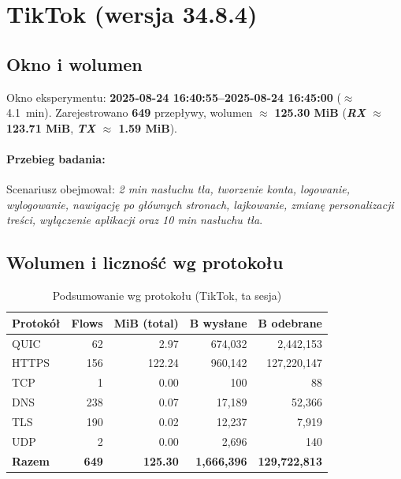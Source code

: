 \section{TikTok (wersja 34.8.4)}
\label{sec:tiktok}

\subsection*{Okno i wolumen}
Okno eksperymentu: \textbf{2025-08-24 16{:}40{:}55–2025-08-24 16{:}45{:}00} ($\approx$ \SI{4.1}{\minute}). 
Zarejestrowano \textbf{649} przepływy, wolumen $\approx$ \textbf{125.30 MiB} 
(\textbf{\emph{RX} $\approx$ 123.71 MiB}, \textbf{\emph{TX} $\approx$ 1.59 MiB}).

\paragraph{Przebieg badania:} 
Scenariusz obejmował: \emph{2 min nasłuchu tła, tworzenie konta, logowanie, wylogowanie, nawigację po głównych stronach, lajkowanie, zmianę personalizacji treści, wyłączenie aplikacji oraz 10 min nasłuchu tła}.

\subsection{Wolumen i liczność wg protokołu}
\begin{table}[H]
  \centering
  \caption{Podsumowanie wg protokołu (TikTok, ta sesja)}
  \label{tab:tiktok-proto}
  \begin{tabular}{lrrrr}
    \toprule
    \textbf{Protokół} & \textbf{Flows} & \textbf{MiB (total)} & \textbf{B wysłane} & \textbf{B odebrane} \\
    \midrule
    QUIC  & 62  & 2.97  & 674{,}032  & 2{,}442{,}153 \\
    HTTPS & 156 & 122.24 & 960{,}142 & 127{,}220{,}147 \\
    TCP   & 1   & 0.00  & 100       & 88 \\
    DNS   & 238 & 0.07  & 17{,}189  & 52{,}366 \\
    TLS   & 190 & 0.02  & 12{,}237  & 7{,}919 \\
    UDP   & 2   & 0.00  & 2{,}696   & 140 \\
    \midrule
    \textbf{Razem} & \textbf{649} & \textbf{125.30} & \textbf{1{,}666{,}396} & \textbf{129{,}722{,}813} \\
    \bottomrule
  \end{tabular}
\end{table}

